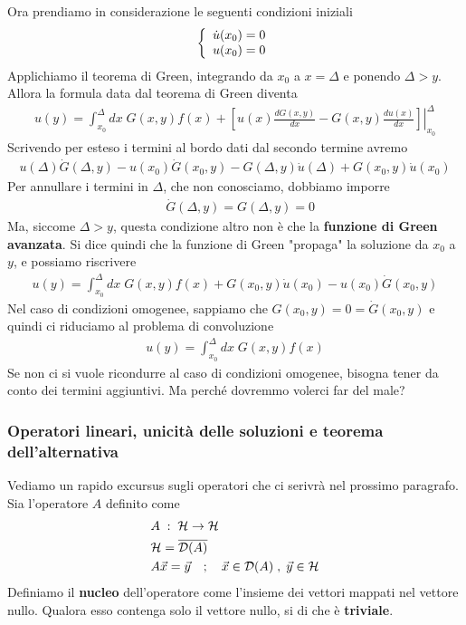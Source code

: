 Ora prendiamo in considerazione le seguenti condizioni iniziali
\begin{align}
	\left\{ \begin{array}{cc} \dot{u}(x_0)=0\\ u(x_0)=0 \end{array} \right.
\end{align}
Applichiamo il teorema di Green, integrando da $x_0$ a $x = \Delta$ e ponendo $\Delta > y$. 
Allora la formula data dal teorema di Green diventa
\begin{align}
	u(y) = \int_{x_0}^{\Delta} dx \; G(x,y) f(x) + \left.\left[ u(x) \frac{dG(x,y)}{dx} - G(x,y) \frac{du(x)}{dx} \right]\right|_{x_0}^\Delta
\end{align}
Scrivendo per esteso i termini al bordo dati dal secondo termine avremo
\begin{align}
	u(\Delta) \dot{G}(\Delta,y) - u(x_0) \dot{G}(x_0,y) - G(\Delta,y) \dot{u}(\Delta) + G(x_0,y) \dot{u}(x_0) 
\end{align}
Per annullare i termini in $\Delta$, che non conosciamo, dobbiamo imporre 
\begin{align}
	&\dot{G}(\Delta, y) = G(\Delta, y) = 0	
\end{align}
Ma, siccome $\Delta>y$, questa condizione altro non è che la \textbf{funzione di Green avanzata}. Si dice quindi che la funzione di Green "propaga" la soluzione da $x_0$ a $y$, e possiamo riscrivere
\begin{align}
	u(y) = \int_{x_0}^{\Delta} dx \; G(x,y) f(x) +  G(x_0,y) \dot{u}(x_0) - u(x_0) \dot{G}(x_0,y) 
\end{align}
Nel caso di condizioni omogenee, sappiamo che $G(x_0,y) = 0 = \dot{G}(x_0,y)$ e quindi ci riduciamo al problema di convoluzione
\begin{align}
	u(y) = \int_{x_0}^{\Delta} dx \; G(x,y) f(x)
\end{align}
Se non ci si vuole ricondurre al caso di condizioni omogenee, bisogna tener da conto dei termini aggiuntivi. Ma perché dovremmo volerci far del male?

\subsubsection{Operatori lineari, unicità delle soluzioni e teorema dell'alternativa}

Vediamo un rapido excursus sugli operatori che ci serivrà nel prossimo paragrafo. 
Sia l'operatore $A$ definito come
\begin{align}
	&A \; : \; \mathcal{H} \to \mathcal{H}\\
	&\mathcal{H} = \overline{\mathcal{D}(A)}\\
	&A \vec{x} = \vec{y} \quad ; \quad \vec{x} \in \mathcal{D}(A) \; , \; \vec{y} \in \mathcal{H} \label{syseq}
\end{align}
Definiamo il \textbf{nucleo} dell'operatore come l'insieme dei vettori mappati nel vettore nullo. Qualora esso contenga solo il vettore nullo, si di che è \textbf{triviale}.

